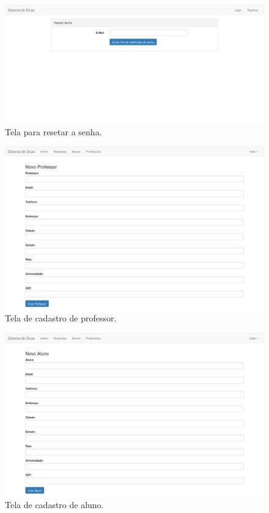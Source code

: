 \begin{figure}[h]
	\captionsetup{justification=centering}
	\includegraphics[width=\linewidth]{imagenssoftware/resetarsenha.png}
	\caption{Tela para resetar a senha.}
	\label{figura:resetarsenha}
\end{figure}

\begin{figure}[h]
	\captionsetup{justification=centering}
	\includegraphics[width=\linewidth]{imagenssoftware/cadastroprofessor.png}
	\caption{Tela de cadastro de professor.}
	\label{figura:cadastroprofessor}
\end{figure}

\begin{figure}[h]
	\captionsetup{justification=centering}
	\includegraphics[width=\linewidth]{imagenssoftware/cadastroaluno.png}
	\caption{Tela de cadastro de aluno.}
	\label{figura:cadastroaluno}
\end{figure}